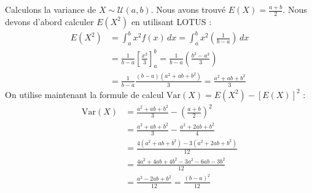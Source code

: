 \begin{examplebox}
Calculons la variance de $X \sim \mathcal{U}(a, b)$.
Nous avons trouvé $E(X) = \frac{a+b}{2}$.
Nous devons d'abord calculer $E(X^2)$ en utilisant LOTUS :
\begin{align*}
E(X^2) &= \int_a^b x^2 f(x) \, dx = \int_a^b x^2 \left( \frac{1}{b-a} \right) \, dx \\
&= \frac{1}{b-a} \left[ \frac{x^3}{3} \right]_a^b = \frac{1}{b-a} \left( \frac{b^3 - a^3}{3} \right) \\
&= \frac{1}{b-a} \frac{(b-a)(a^2+ab+b^2)}{3} = \frac{a^2+ab+b^2}{3}
\end{align*}
On utilise maintenant la formule de calcul $\text{Var}(X) = E(X^2) - [E(X)]^2$ :
\begin{align*}
\text{Var}(X) &= \frac{a^2+ab+b^2}{3} - \left( \frac{a+b}{2} \right)^2 \\
&= \frac{a^2+ab+b^2}{3} - \frac{a^2+2ab+b^2}{4} \\
&= \frac{4(a^2+ab+b^2) - 3(a^2+2ab+b^2)}{12} \\
&= \frac{4a^2+4ab+4b^2 - 3a^2-6ab-3b^2}{12} \\
&= \frac{a^2-2ab+b^2}{12} = \frac{(b-a)^2}{12}
\end{align*}
\end{examplebox}